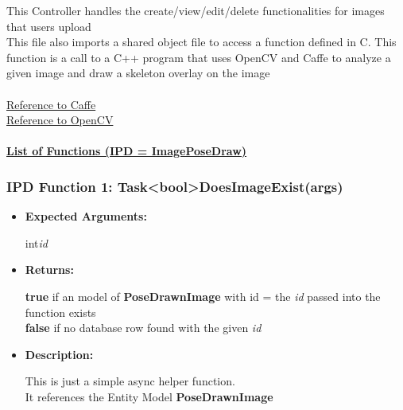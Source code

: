 \documentclass{scrreprt}
\begin{document}
This Controller handles the create/view/edit/delete functionalities for images that users upload
\\
This file also imports a shared object file to access a function defined in C. This function is a call to a C++ program that uses OpenCV and Caffe to analyze a given image and draw a skeleton overlay on the image
\\\\
\href{http://caffe.berkeleyvision.org/doxygen/index.html}{Reference to Caffe}
\\
\href{http://docs.opencv.org/3.1.0/}{Reference to OpenCV}
\\\\
\underline{ \textbf{List of Functions (IPD = ImagePoseDraw)}}

\subsubsection{IPD Function 1: Task\textless bool\textgreater DoesImageExist(args)}
\begin{itemize}
    \item \textbf{Expected Arguments:}

    int\quad\textit{id}

    \item \textbf{Returns:}

    \textbf{true} if an model of \textbf{PoseDrawnImage} with id = the \textit{id} passed into the function exists
    \\
    \textbf{false} if no database row found with the given \textit{id}

    \item \textbf{Description:}

    This is just a simple async helper function.
    \\
    It references the Entity Model \textbf{PoseDrawnImage}
\end{itemize}
\end{document}
